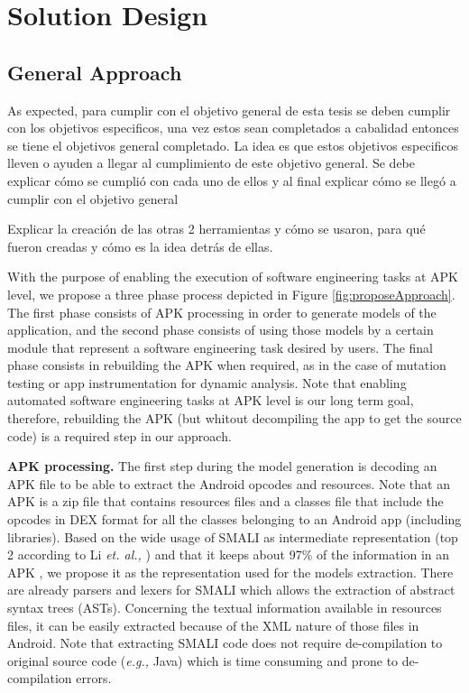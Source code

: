 
\chapter{Solution Design} %

\label{Chapter4} %

\section{General Approach} \label{sec:generalApproach}


As expected, para cumplir con el objetivo general de esta tesis se deben cumplir con los objetivos especificos, una vez estos sean completados a cabalidad entonces se tiene el objetivos general completado.
La idea es que estos objetivos especificos lleven o ayuden a llegar al cumplimiento de este objetivo general.
Se debe explicar cómo se cumplió con cada uno de ellos y al final explicar cómo se llegó a cumplir con el objetivo general

Explicar la creación de las otras 2 herramientas y cómo se usaron, para qué fueron creadas y cómo es la idea detrás de ellas.



With the purpose of enabling the execution of software engineering tasks at APK level, we propose a three phase process depicted in Figure \ref{fig:proposeApproach}. The first phase consists of APK processing in order to generate models of the application, and the second phase consists of using those models by a certain module that represent a software engineering task desired by users. The final phase consists in rebuilding the APK when required, as in the case of mutation testing or app instrumentation for dynamic analysis. Note that enabling automated software engineering tasks at APK level is our long term goal, therefore, rebuilding the APK (but whitout decompiling the app to get the source code) is a required step in our approach.

\textbf{APK processing.} The first step during the model generation is  decoding an APK file to be able to extract the Android opcodes and resources. Note that an APK is a zip file that contains resources files and a classes file that include the opcodes in DEX format for all the classes belonging to an Android app (including libraries). Based on the wide usage of SMALI as intermediate representation (top 2 according to Li \textit{et. al.,} \cite{li:IST2017}) and that it keeps about 97\% of the information in an APK  \cite{arnatovich2014empirical,arnatovich2018comparison}, we propose it as the representation used for the models extraction. There are already parsers and lexers for SMALI which allows the extraction of abstract syntax trees (ASTs). Concerning the textual information available in resources files, it can be easily extracted because of the XML nature of those files in Android. Note that extracting SMALI code does not require de-compilation to original source code (\textit{e.g.,} Java) which is time consuming and prone to de-compilation errors.

